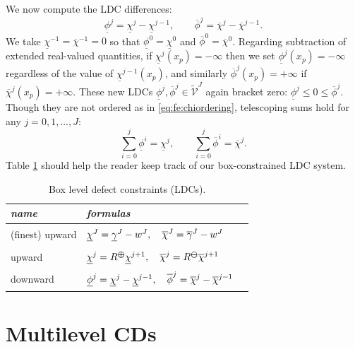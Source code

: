 \documentclass[letterpaper,final,12pt,reqno]{amsart}
\theoremstyle{cstyle}
\theoremstyle{cstyle*}
\theoremstyle{dstyle}
\numberwithin{equation}{section}
\numberwithin{figure}{section}
\numberwithin{table}{section}
\numberwithin{theorem}{section}
\newcommand{\maxR}{R^{\bm{\oplus}}}
\newcommand{\minR}{R^{\bm{\ominus}}}
\begin{document}
We now compute the LDC differences:
\begin{equation}
\underline{\phi}^j = \underline{\chi}^j - \underline{\chi}^{j-1}, \qquad \overline{\phi}^j = \overline{\chi}^j - \overline{\chi}^{j-1}.  \label{eq:fe:philevels}
\end{equation}
We take $\underline{\chi}^{-1}=\overline{\chi}^{-1}=0$ so that $\underline{\phi}^0=\underline{\chi}^0$ and $\overline{\phi}^0=\overline{\chi}^0$.  Regarding subtraction of extended real-valued quantities, if $\underline{\chi}^j(x_p)=-\infty$ then we set $\underline{\phi}^j(x_p)=-\infty$ regardless of the value of $\underline{\chi}^{j-1}(x_p)$, and similarly $\overline{\phi}^j(x_p)=+\infty$ if $\overline{\chi}^j(x_p)=+\infty$.  These new LDCs $\underline{\phi}^{j},\overline{\phi}^{j} \in \tilde{\mathcal{V}}^J$ again bracket zero: $\underline{\phi}^j \le 0 \le \overline{\phi}^j$.  Though  they are not ordered as in \eqref{eq:fe:chiordering}, telescoping sums hold for any $j=0,1,\dots,J$:
\begin{equation}
\sum_{i=0}^j \underline{\phi}^i = \underline{\chi}^j, \qquad \sum_{i=0}^j \overline{\phi}^i = \overline{\chi}^j.  \label{eq:fe:telescoping}
\end{equation}
Table \ref{tab:ldcs} should help the reader keep track of our box-constrained LDC system.

\begin{table}[H]
\begin{tabular}{llc}
\emph{name}        & \emph{formulas} \\ \hline
(finest) upward & ${\Large \strut} \underline{\chi}^J = \underline{\gamma}^J - w^J,\quad \overline{\chi}^J = \overline{\gamma}^J - w^J$ \\
upward          & ${\Large \strut} \underline{\chi}^{j} = \maxR \underline{\chi}^{j+1}, \quad \overline{\chi}^{j} = \minR \overline{\chi}^{j+1}$ \\
downward        & ${\Large \strut} \underline{\phi}^j = \underline{\chi}^j - \underline{\chi}^{j-1}, \quad \overline{\phi}^j = \overline{\chi}^j - \overline{\chi}^{j-1}$
\end{tabular}

\medskip
\caption{Box level defect constraints (LDCs).}
\label{tab:ldcs}
\end{table}


\section{Multilevel CDs} \label{sec:cdmultilevel}
\end{document}
